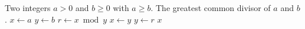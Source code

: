 
\begin{algorithmic}[1]
\Require Two integers $a > 0$ and $b \geq 0$ with $a \geq b$.
\Ensure The greatest common divisor of $a$ and $b$.
\State $x \gets a$
\State $y \gets b$
  \State $r \gets x \bmod y$
  \State $x \gets y$
  \State $y \gets r$
\EndWhile
\State \Return $x$
\end{algorithmic}
